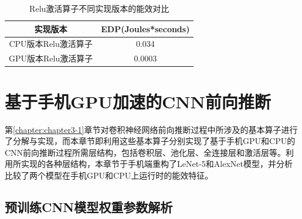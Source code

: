 \begin{table}[htbp]
  \centering
  \caption{Relu激活算子不同实现版本的能效对比}
  \label{table:table4}
  \begin{tabular}{cc}
    \toprule
      实现版本 & EDP(Joules*seconds) \\
    \midrule
      CPU版本Relu激活算子 & 0.034 \\
      GPU版本Relu激活算子 & 0.0003 \\
    \bottomrule
  \end{tabular}
\end{table}


\section{基于手机GPU加速的CNN前向推断}

第\ref{chapter:chapter3-1}章节对卷积神经网络前向推断过程中所涉及的基本算子进行了分解与实现，而本章节即利用这些基本算子分别实现了基于手机GPU和CPU的CNN前向推断过程所需层结构，包括卷积层、池化层、全连接层和激活层等。利用所实现的各种层结构，本章节于手机端重构了LeNet-5和AlexNet模型，并分析比较了两个模型在手机GPU和CPU上运行时的能效特征。

\subsection{预训练CNN模型权重参数解析}
\label{chapter:chapter321}

